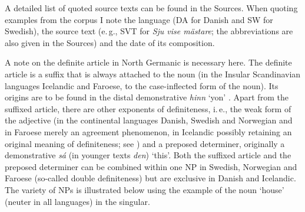 \documentclass[output=paper]{langsci/langscibook}
\begin{document}
A detailed list of quoted source texts can be found in the Sources. When quoting examples from the corpus I note the language (DA for Danish and SW for Swedish), the source text (e.\,g., SVT for {\emph{Sju vise mästare}}; the abbreviations are also given in the Sources) and the date of its composition. 

A note on the definite article in North Germanic is necessary here. The definite article is a suffix that is always attached to the noun (in the Insular Scandinavian languages Icelandic and Faroese, to the case-inflected form of the noun). Its origins are to be found in the distal demonstrative {\emph{hinn}} `yon' \citep[e.\,g.,][]{perridon:89}. Apart from the suffixed article, there are other exponents of definiteness, i.\,e., the weak form of the adjective (in the continental languages Danish, Swedish and Norwegian and in Faroese merely an agreement phenomenon, in Icelandic possibly retaining an original meaning of definiteness; see \citealt{naert:69}) and a preposed determiner, originally a demonstrative {\emph{sá}} (in younger texts {\emph{den}}) `this'. Both the suffixed article and the preposed determiner can be combined within one NP in Swedish, Norwegian and Faroese (so-called double definiteness) but are exclusive in Danish and Icelandic. The variety of NPs is illustrated below using the example of the noun `house' (neuter in all languages) in the singular. 
\end{document}

